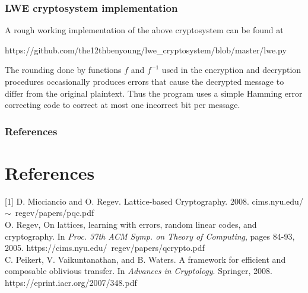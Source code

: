 \documentclass{beamer}
\begin{document}
\begin{frame}
    \frametitle{LWE cryptosystem implementation}
    A rough working implementation of the above cryptosystem can
    be found at
    \bigskip\\
    {\footnotesize https://github.com/the12thbenyoung/lwe\_cryptosystem/blob/master/lwe.py \par}
    \bigskip
    The rounding done by functions $f$ and $f^{-1}$
    used in the encryption and decryption procedures occasionally produces
    errors that cause the decrypted message to differ from the original plaintext.
    Thus the program uses a simple Hamming error correcting code to correct at
    most one incorrect bit per message.
\end{frame}

\begin{frame}
\frametitle{References}
\section{References}\label{sec:references}
[1] D. Micciancio and O. Regev. Lattice-based Cryptography. 2008. cims.nyu.edu/$\sim$~regev/papers/pqc.pdf
\bigskip \\
\noindent [2] O. Regev, On lattices, learning with errors, random linear codes,
and cryptography. In \textit{Proc. 37th ACM Symp. on Theory of Computing}, pages 84-93, 2005. https://cims.nyu.edu/~regev/papers/qcrypto.pdf
\bigskip \\
\noindent [3] C. Peikert, V. Vaikuntanathan, and B. Waters. A framework for
efficient and composable oblivious transfer. In \textit{Advances in
Cryptology}. Springer, 2008. https://eprint.iacr.org/2007/348.pdf
\end{frame}
\end{document}
